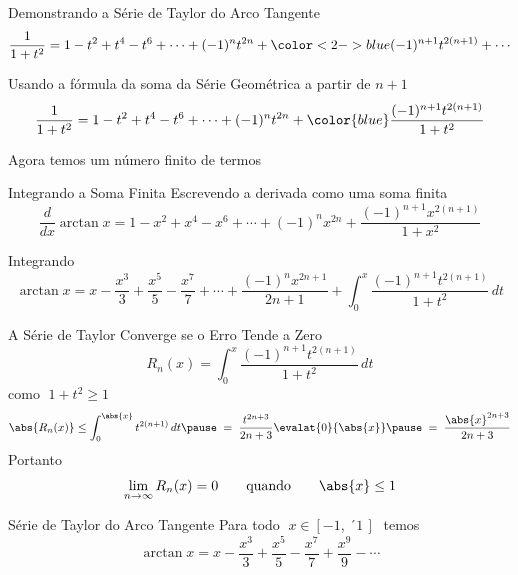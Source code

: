 \documentclass[fleqn,utf8,aspectratio=169,12pt]{beamer}
\begin{document}
\begin{frame}{Demonstrando a Série de Taylor do Arco Tangente}
  \[
    \frac{1}{1+t^2} = 1 - t^2 + t^4 - t^6 + \cdots
                    + (-1)^n t^{2n}
                    + {\color<2->{blue}(-1)^{n+1} t^{2(n+1)} + \cdots}
  \]

  \pause
  \vspace{0.5\baselineskip}
  Usando a fórmula da soma da Série Geométrica a partir de $n+1$
  \[
    \frac{1}{1+t^2} = 1 - t^2 + t^4 - t^6 + \cdots
                    + (-1)^n t^{2n}
                    + {\color{blue}\frac{(-1)^{n+1} t^{2(n+1)}}{1+t^2}}
  \]

  \pause
  \vspace{0.5\baselineskip}
  Agora temos um número finito de termos
\end{frame}

\begin{frame}{Integrando a Soma Finita}
  Escrevendo a derivada como uma soma finita
  \[
    \frac{d}{dx} \arctan x = 1 - x^2 + x^4 - x^6
                           + \cdots
                           + (-1)^n x^{2n}
                           + \frac{(-1)^{n+1} x^{2(n+1)}}{1+x^2}
  \]

  \pause
  \vspace{0.5\baselineskip}
  Integrando
  \[
    \arctan x = x - \frac{x^3}{3}
                  + \frac{x^5}{5}
                  - \frac{x^7}{7}
                  + \cdots
                  + \frac{(-1)^n x^{2n+1}}{2n+1}
                  + \int_0^x \frac{(-1)^{n+1} t^{2(n+1)}}{1+t^2} \,dt
  \]
\end{frame}

\begin{frame}{A Série de Taylor Converge se o Erro Tende a Zero}
  \[
    R_n(x) = \int_0^x \frac{(-1)^{n+1} t^{2(n+1)}}{1+t^2} \,dt
  \]
  \pause
  como \(\;1+t^2\geq 1\;\)
  \[
    \abs{R_n(x)} \leq \int_0^{\abs{x}} t^{2(n+1)} \,dt \pause
      \; = \; \frac{t^{2n+3}}{2n+3}\evalat{0}{\abs{x}} \pause
      \; = \; \frac{\abs{x}^{2n+3}}{2n+3}
  \]
  \pause
  Portanto
  \[
    \lim_{n\to\infty} R_n(x) = 0 \qquad\text{quando}\qquad \abs{x} \leq 1
  \]
\end{frame}

\begin{frame}{Série de Taylor do Arco Tangente}
  Para todo \(\;x\in[-1,\,´1\,]\;\) temos
  \[
    \arctan x = x - \frac{x^3}{3}
                  + \frac{x^5}{5}
                  - \frac{x^7}{7}
                  + \frac{x^9}{9}
                  - \cdots
  \]
\end{frame}

\begin{frame}{\contentsname}
  \tableofcontents
\end{frame}

\end{document}
